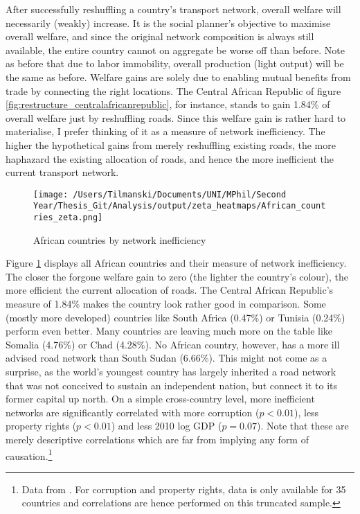 \documentclass[11pt, oneside]{article}   	%
\begin{document}
After successfully reshuffling a country's transport network, overall welfare will necessarily (weakly) increase. It is the social planner's objective to maximise overall welfare, and since the original network composition is always still available, the entire country cannot on aggregate be worse off than before. Note as before that due to labor immobility, overall production (light output) will be the same as before. Welfare gains are solely due to enabling mutual benefits from trade by connecting the right locations. The Central African Republic of figure \ref{fig:restructure_centralafricanrepublic}, for instance, stands to gain 1.84\% of overall welfare just by reshuffling roads. Since this welfare gain is rather hard to materialise, I prefer thinking of it as a measure of network inefficiency. The higher the hypothetical gains from merely reshuffling existing roads, the more haphazard the existing allocation of roads, and hence the more inefficient the current transport network.

\begin{figure}
\centering
\caption{African countries by network inefficiency}
\texttt{[image: /Users/Tilmanski/Documents/UNI/MPhil/Second Year/Thesis\_Git/Analysis/output/zeta\_heatmaps/African\_countries\_zeta.png]}

\label{fig:countries_by_welfare_gain}
\end{figure}

Figure \ref{fig:countries_by_welfare_gain} displays all African countries and their measure of network inefficiency. The closer the forgone welfare gain to zero (the lighter the country's colour), the more efficient the current allocation of roads. The Central African Republic's measure of 1.84\% makes the country look rather good in comparison. Some (mostly more developed) countries like South Africa (0.47\%) or Tunisia (0.24\%) perform even better. Many countries are leaving much more on the table like Somalia (4.76\%) or Chad (4.28\%). No African country, however, has a more ill advised road network than South Sudan (6.66\%). This might not come as a surprise, as the world's youngest country has largely inherited a road network that was not conceived to sustain an independent nation, but connect it to its former capital up north. On a simple cross-country level, more inefficient networks are significantly correlated with more corruption ($p < 0.01$), less property rights ($p < 0.01$) and less 2010 log GDP ($p=0.07$). Note that these are merely descriptive correlations which are far from implying any form of causation.\footnote{Data from \cite{the_world_bank_world_2017}. For corruption and property rights, data is only available for 35 countries and correlations are hence performed on this truncated sample.}
\end{document}
